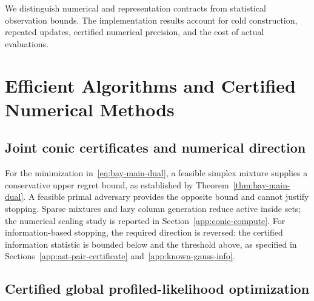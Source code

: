 \documentclass{article}
\theoremstyle{plain}
\theoremstyle{definition}
\begin{document}
\clearpage
{}
{}
\par\medskip
We distinguish numerical and representation contracts from statistical observation bounds. The implementation results account for cold construction, repeated updates, certified numerical precision, and the cost of actual evaluations.

\section{Efficient Algorithms and Certified Numerical Methods}
\label{app:group-compute}

\subsection{Joint conic certificates and numerical direction}

For the minimization in~\eqref{eq:bay-main-dual}, a feasible simplex mixture supplies a conservative upper regret bound, as established by Theorem~\ref{thm:bay-main-dual}. A feasible primal adversary provides the opposite bound and cannot justify stopping. Sparse mixtures and lazy column generation reduce active inside sets; the numerical scaling study is reported in Section~\ref{app:conic-compute}. For information-based stopping, the required direction is reversed: the certified information statistic is bounded below and the threshold above, as specified in Sections~\ref{app:ast-pair-certificate} and~\ref{app:known-gauss-info}.

\subsection{Certified global profiled-likelihood optimization}
\end{document}
